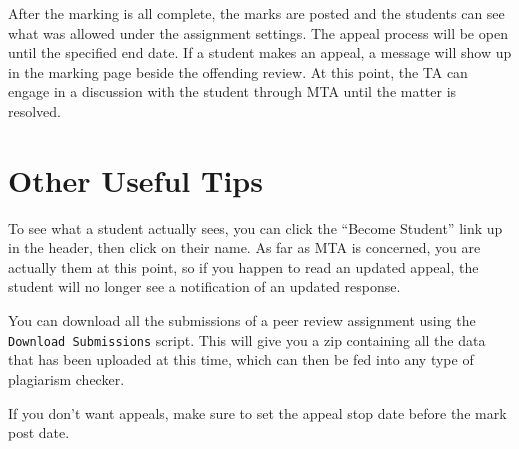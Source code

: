 \documentclass[11pt,letterpaper,oneside]{article}
\begin{document}
After the marking is all complete,  the marks are posted and the students can see what was allowed under the assignment settings. The appeal process will be open until the specified end date. If a student makes an appeal,  a message will show up in the marking page beside the offending review. At this point,  the TA can engage in a discussion with the student through MTA until the matter is resolved.

\section{Other Useful Tips}

To see what a student actually sees,  you can click the ``Become Student'' link up in the header,  then click on their name. As far as MTA is concerned, you are actually them at this point, so if you happen to read an updated appeal,  the student will no longer see a notification of an updated response.

You can download all the submissions of a peer review assignment using the \texttt{Download Submissions} script. This will give you a zip containing all the data that has been uploaded at this time,  which can then be fed into any type of plagiarism checker.

If you don't want appeals,  make sure to set the appeal stop date before the mark post date.
\end{document}
